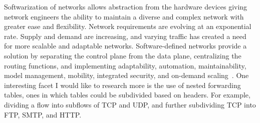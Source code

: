 \documentclass[11pt]{article}
\begin{document}
Softwarization of networks allows abstraction from the hardware devices giving network engineers the ability to maintain a diverse and complex network with greater ease and flexibility. Network requirements are evolving at an exponential rate. Supply and demand are increasing, and varying traffic has created a need for more scalable and adaptable networks. Software-defined networks provide a solution by separating the control plane from the data plane, centralizing the routing functions, and implementing adaptability, automation, maintainability, model management, mobility, integrated security, and on-demand scaling~\cite{Kurose}. One interesting facet I would like to research more is the use of nested forwarding tables, ones in which tables could be subdivided based on headers. For example, dividing a flow into subflows of TCP and UDP, and further subdividing TCP into FTP, SMTP, and HTTP.

\newpage


\end{document}
